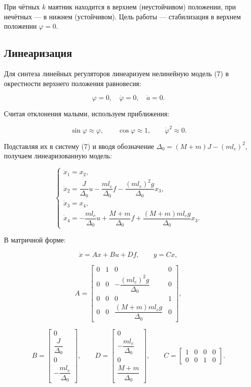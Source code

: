 \documentclass[a4paper,12pt]{article}
\begin{document}
При чётных \(k\) маятник находится в верхнем (неустойчивом) положении, при нечётных — в нижнем (устойчивом). Цель работы — стабилизация в верхнем положении \(\varphi = 0\).

\subsection{Линеаризация}

Для синтеза линейных регуляторов линеаризуем нелинейную модель (7) в окрестности верхнего положения равновесия:

\[
\varphi = 0, \quad \dot{\varphi} = 0, \quad \dot{a} = 0.
\]

Считая отклонения малыми, используем приближения:

\[
\sin \varphi \approx \varphi, \qquad \cos \varphi \approx 1, \qquad \dot{\varphi}^2 \approx 0.
\]

Подставляя их в систему (7) и вводя обозначение \(\Delta_0 = (M+m)J - (m l_c)^2\), получаем линеаризованную модель:

\[
\begin{cases}
	\dot{x}_1 = x_2, \\[4pt]
	\dot{x}_2 = \dfrac{J}{\Delta_0}u - \dfrac{m l_c}{\Delta_0}f - \dfrac{(m l_c)^2 g}{\Delta_0}x_3, \\[8pt]
	\dot{x}_3 = x_4, \\[4pt]
	\dot{x}_4 = -\dfrac{m l_c}{\Delta_0}u + \dfrac{M+m}{\Delta_0}f + \dfrac{(M+m) m l_c g}{\Delta_0}x_3.
\end{cases}
\]

В матричной форме:

\[
\dot{x} = Ax + Bu + Df, \qquad y = Cx,
\]

\[
A = \begin{bmatrix}
	0 & 1 & 0 & 0 \\
	0 & 0 & -\dfrac{(m l_c)^2 g}{\Delta_0} & 0 \\
	0 & 0 & 0 & 1 \\
	0 & 0 & \dfrac{(M+m) m l_c g}{\Delta_0} & 0
\end{bmatrix},
\]

\[
B = \begin{bmatrix}
	0 \\[4pt] \dfrac{J}{\Delta_0} \\[4pt] 0 \\[4pt] -\dfrac{m l_c}{\Delta_0}
\end{bmatrix},
\qquad
D = \begin{bmatrix}
	0 \\[4pt] -\dfrac{m l_c}{\Delta_0} \\[4pt] 0 \\[4pt] \dfrac{M+m}{\Delta_0}
\end{bmatrix},
\qquad
C = \begin{bmatrix}
	1 & 0 & 0 & 0 \\
	0 & 0 & 1 & 0
\end{bmatrix}.
\]
		
\end{document}
